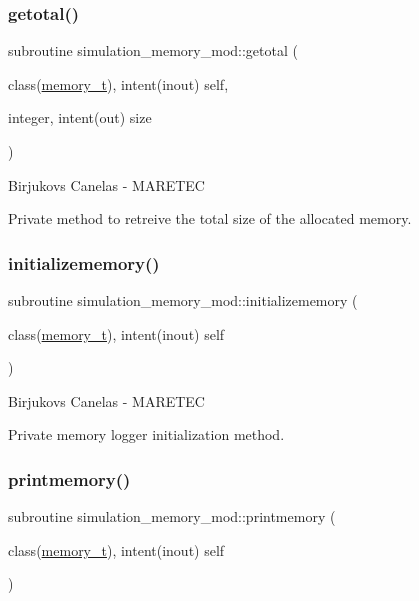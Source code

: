 \subsubsection{\texorpdfstring{getotal()}{getotal()}}
{\footnotesize\ttfamily subroutine simulation\+\_\+memory\+\_\+mod\+::getotal (\begin{DoxyParamCaption}\item[{class(\hyperlink{structsimulation__memory__mod_1_1memory__t}{memory\+\_\+t}), intent(inout)}]{self,  }\item[{integer, intent(out)}]{size }\end{DoxyParamCaption})\hspace{0.3cm}{\ttfamily [private]}}



Birjukovs Canelas -\/ M\+A\+R\+E\+T\+EC 

Private method to retreive the total size of the allocated memory. \mbox{\label{namespacesimulation__memory__mod_ac8306165e4ec88fec9a2b8b719f61893}} 
\subsubsection{\texorpdfstring{initializememory()}{initializememory()}}
{\footnotesize\ttfamily subroutine simulation\+\_\+memory\+\_\+mod\+::initializememory (\begin{DoxyParamCaption}\item[{class(\hyperlink{structsimulation__memory__mod_1_1memory__t}{memory\+\_\+t}), intent(inout)}]{self }\end{DoxyParamCaption})\hspace{0.3cm}{\ttfamily [private]}}



Birjukovs Canelas -\/ M\+A\+R\+E\+T\+EC 

Private memory logger initialization method. \mbox{\label{namespacesimulation__memory__mod_a16a7a1c7e88fe5a5523d23f83f0e04a0}} 
\subsubsection{\texorpdfstring{printmemory()}{printmemory()}}
{\footnotesize\ttfamily subroutine simulation\+\_\+memory\+\_\+mod\+::printmemory (\begin{DoxyParamCaption}\item[{class(\hyperlink{structsimulation__memory__mod_1_1memory__t}{memory\+\_\+t}), intent(inout)}]{self }\end{DoxyParamCaption})\hspace{0.3cm}{\ttfamily [private]}}



